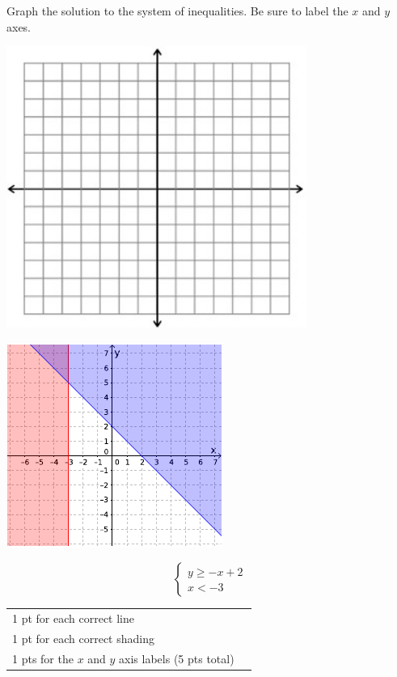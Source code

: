 {
	Graph the solution to the system of inequalities. Be sure to label the $x$ and $y$ axes. \begin{onlyproblem}\begin{center}\includegraphics{fig-graphpaper.png}\end{center}\end{onlyproblem} \begin{onlysolution}\begin{center}\includegraphics{fig095-12-5-c-answer}\end{center}\end{onlysolution}
	$$\begin{cases}y\geq -x+2 \\ x<-3 \end{cases}$$
}
{
	\begin{tabular}{l r}
	1 pt for each correct line\\
	1 pt for each correct shading\\
	1 pts for the $x$ and $y$ axis labels (5 pts total)\\
	\end{tabular}
}

